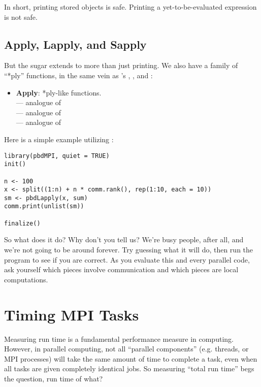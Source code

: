 In short, printing stored objects is safe.  Printing a yet-to-be-evaluated expression is not safe.





\subsection{Apply, Lapply, and Sapply}\label{sec:pbdsugar2}

But the  sugar extends to more than just printing.  We also have a family of ``*ply'' functions, in the same vein as 's , , and :
\begin{itemize}
  \item \textbf{Apply}: *ply-like functions.\\
   --- analogue of \\
   --- analogue of \\
   --- analogue of \\
\end{itemize}

Here is a simple example utilizing :
    
\begin{lstlisting}[language=rr,title=Example 4]
library(pbdMPI, quiet = TRUE)
init()

n <- 100
x <- split((1:n) + n * comm.rank(), rep(1:10, each = 10))
sm <- pbdLapply(x, sum)
comm.print(unlist(sm))

finalize()
\end{lstlisting}

So what does it do?  Why don't you tell us?  We're busy people, after all, and we're not going to be around forever.  Try guessing what it will do, then run the program to see if you are correct.  As you evaluate this and every parallel code, ask yourself which pieces involve communication and which pieces are local computations.





\section{Timing MPI Tasks}

Measuring run time is a fundamental performance measure in computing.  However, in parallel computing, not all ``parallel components'' (e.g. threads, or MPI processes) will take the same amount of time to complete a task, even when all tasks are given completely identical jobs.  So measuring ``total run time'' begs the question, run time of what?

